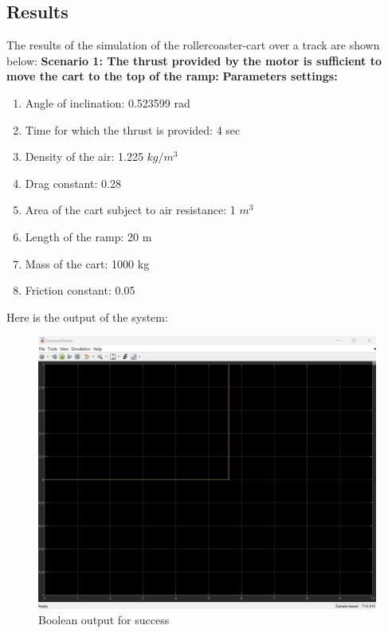 \documentclass{article}
\begin{document}
    \subsection{Results}
    The results of the simulation of the rollercoaster-cart over a track are
    shown below:
    \newline
    \newline
    \textbf{Scenario 1: The thrust provided by the motor is sufficient to move the
    cart to the top of the ramp: }
    \newline
    \newline
    \textbf{Parameters settings:}
    \newline
    \begin{enumerate}
        \item Angle of inclination: 0.523599 rad

        \item Time for which the thrust is provided: 4 sec

        \item Density of the air: 1.225 $kg/m^{3}$

        \item Drag constant: 0.28

        \item Area of the cart subject to air resistance: 1 $m^{3}$

        \item Length of the ramp: 20 m

        \item Mass of the cart: 1000 kg

        \item Friction constant: 0.05
    \end{enumerate}
    Here is the output of the system:
    \begin{figure}[H]
        \centering
        \includegraphics[width=0.8\linewidth]{success_1.png}
        \caption{Boolean output for success}
        \label{fig:Boolean_output}
    \end{figure}
\end{document}
